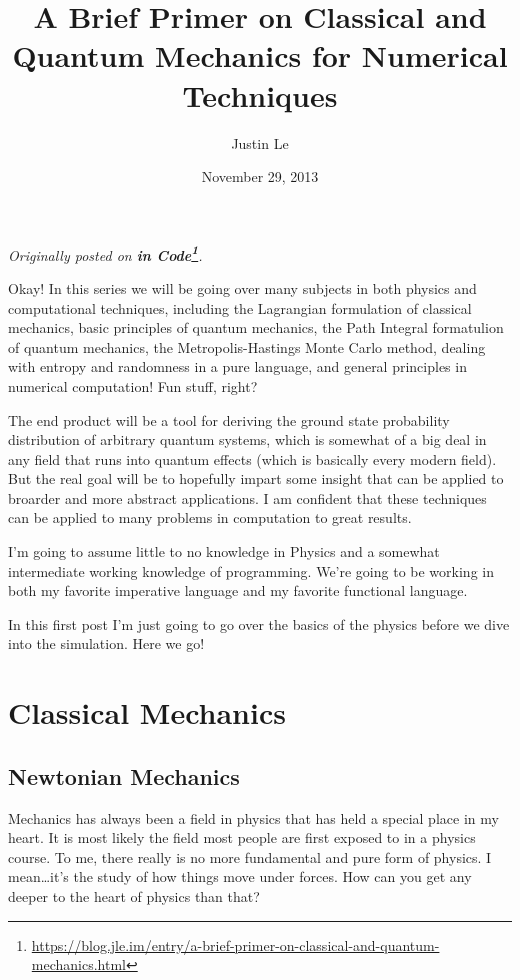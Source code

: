 \documentclass[]{article}
\title{A Brief Primer on Classical and Quantum Mechanics for Numerical Techniques}
\author{Justin Le}
\date{November 29, 2013}
\renewcommand{\href}[2]{#2\footnote{\url{#1}}}
\begin{document}
\maketitle

\emph{Originally posted on
\textbf{\href{https://blog.jle.im/entry/a-brief-primer-on-classical-and-quantum-mechanics.html}{in
Code}}.}

Okay! In this series we will be going over many subjects in both physics and
computational techniques, including the Lagrangian formulation of classical
mechanics, basic principles of quantum mechanics, the Path Integral formatulion
of quantum mechanics, the Metropolis-Hastings Monte Carlo method, dealing with
entropy and randomness in a pure language, and general principles in numerical
computation! Fun stuff, right?

The end product will be a tool for deriving the ground state probability
distribution of arbitrary quantum systems, which is somewhat of a big deal in
any field that runs into quantum effects (which is basically every modern
field). But the real goal will be to hopefully impart some insight that can be
applied to broarder and more abstract applications. I am confident that these
techniques can be applied to many problems in computation to great results.

I'm going to assume little to no knowledge in Physics and a somewhat
intermediate working knowledge of programming. We're going to be working in both
my favorite imperative language and my favorite functional language.

In this first post I'm just going to go over the basics of the physics before we
dive into the simulation. Here we go!

\hypertarget{classical-mechanics}{%
\section{Classical Mechanics}\label{classical-mechanics}}

\hypertarget{newtonian-mechanics}{%
\subsection{Newtonian Mechanics}\label{newtonian-mechanics}}

Mechanics has always been a field in physics that has held a special place in my
heart. It is most likely the field most people are first exposed to in a physics
course. To me, there really is no more fundamental and pure form of physics. I
mean\ldots{}it's the study of how things move under forces. How can you get any
deeper to the heart of physics than that?
\end{document}

